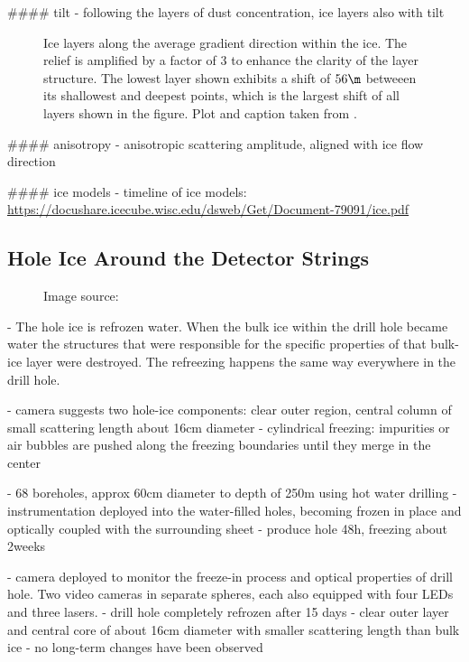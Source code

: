 #### tilt
- following the layers of dust concentration, ice layers also with tilt

\begin{figure}[htbp]
  \centering
  \caption{Ice layers along the average gradient direction within the ice. The relief is amplified by a factor of 3 to enhance the clarity of the layer structure. The lowest layer shown exhibits a shift of $56\m$ betweeen its shallowest and deepest points, which is the largest shift of all layers shown in the figure. Plot and caption taken from \cite[figure 14]{icepaper}.}
  \label{fig:wohr8uaY}
\end{figure}

#### anisotropy
- anisotropic scattering amplitude, aligned with ice flow direction \cite{icrc17pocam}


#### ice models
- timeline of ice models: \url{https://docushare.icecube.wisc.edu/dsweb/Get/Document-79091/ice.pdf} \cite{flasherdataderivedicemodels}





\subsection{Hole Ice Around the Detector Strings}
\label{sec:hole_ice}

\begin{figure}[htbp]
  \caption{Image source: \cite{icrc17pocam}}
  \label{fig:label}
\end{figure}

- The hole ice is refrozen water. When the bulk ice within the drill hole became water the structures that were responsible for the specific properties of that bulk-ice layer were destroyed. The refreezing happens the same way everywhere in the drill hole.

- camera suggests two hole-ice components: clear outer region, central column of small scattering length about 16cm diameter \cite{rongenswedishcamera,instrumentation}
- cylindrical freezing: impurities or air bubbles are pushed along the freezing boundaries until they merge in the center \cite{rongenswedishcamera}

- 68 boreholes, approx 60cm diameter to depth of 250m using hot water drilling\cite{instrumentation}
- instrumentation deployed into the water-filled holes, becoming frozen in place and optically coupled with the surrounding sheet \cite{instrumentation}
- produce hole 48h, freezing about 2weeks \cite{instrumentation}

- camera deployed to monitor the freeze-in process and optical properties of drill hole. Two video cameras in separate spheres, each also equipped with four LEDs and three lasers. \cite{instrumentation}
- drill hole completely refrozen after 15 days \cite{instrumentation}
- clear outer layer and central core of about 16cm diameter with smaller scattering length than bulk ice\cite{instrumentation}
- no long-term changes have been observed \cite{instrumentation}

